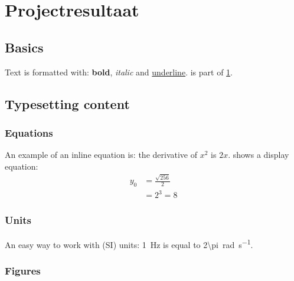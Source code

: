 \chapter{Projectresultaat} \label{cha:your-first-document}


\section{Basics} \label{sec:basics}

Text is formatted with: \textbf{bold}, \textit{italic} and \underline{underline}.
 is part of \cref{cha:your-first-document}.


\section{Typesetting content} \label{sec:typesetting}


\subsection{Equations} \label{subsec:equations}

An example of an inline equation is: the derivative of $x^2$ is $2x$.  shows a display equation:
\begin{align} \label{eq:example}
          y_{0} &= \frac{\sqrt{256}}{2} \\
                &= 2^{3} = 8 \nonumber 
\end{align}


\subsection{Units} \label{subsec:units}

An easy way to work with (SI) units: \SI{1}{\hertz} is equal to \SI{2\pi}{\radian\per\second}.


\subsection{Figures} \label{subsec:figures}

